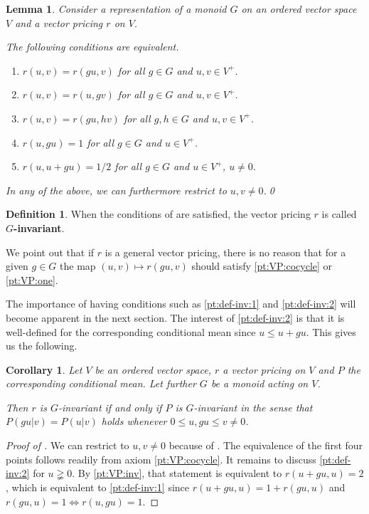 \documentclass[11pt]{amsart}
\numberwithin{equation}{section}
\newtheorem{lem}[thm]{Lemma}
\newtheorem{cor}[thm]{Corollary}
\theoremstyle{definition}
\newtheorem{defi}[thm]{Definition}
\theoremstyle{definition}
\begin{document}
\begin{lem}\label{lem:def-inv}
Consider a representation of a monoid $G$ on an ordered vector space $V$ and a vector pricing $r$ on $V$.

The following conditions are equivalent.
\begin{enumerate}[label=\normalfont(\roman*)]
\item $r(u, v) = r(g u,v)$ for all $g\in G$ and $u,v\in V^+$.
\item $r(u, v) = r(u,g v)$ for all $g\in G$ and $u,v\in V^+$.
\item $r(u, v) = r(g u,h v)$ for all $g, h\in G$ and $u,v\in V^+$.
\item $r(u, g u) = 1$ for all $g\in G$ and $u\in V^+$.\label{pt:def-inv:1}
\item $r(u, u+g u) = 1/2$ for all $g\in G$ and $u\in V^+$, $u\neq 0$.\label{pt:def-inv:2}
\end{enumerate}
In any of the above, we can furthermore restrict to $u,v\neq 0$.\qed
\end{lem}

\begin{defi}\label{defi:def-inv}
When the conditions of  are satisfied, the vector pricing $r$ is called \textbf{$G$-invariant}.
\end{defi}

We point out that if $r$ is a general vector pricing, there is no reason that for a given $g\in G$ the map $(u,v) \mapsto r(g u, v)$ should satisfy \ref{pt:VP:cocycle} or \ref{pt:VP:one}.

The importance of having conditions such as \ref{pt:def-inv:1} and \ref{pt:def-inv:2} will become apparent in the next section. The interest of \ref{pt:def-inv:2} is that it is well-defined for the corresponding conditional mean since $u\leq u+g u$. This gives us the following.

\begin{cor}\label{cor:def-inv}
Let $V$ be an ordered vector space, $r$ a vector pricing on $V$ and $P$ the corresponding conditional mean. Let further $G$ be a monoid acting on $V$.

Then $r$ is $G$-invariant if and only if $P$ is $G$-invariant in the sense that $P(g u | v) = P(u | v)$ holds whenever $0\leq u, g u \leq v\neq 0$.
\end{cor}

\begin{proof}[Proof of ]
We can restrict to $u,v\neq 0$ because of . The equivalence of the first four points follows readily from axiom \ref{pt:VP:cocycle}. It remains to discuss \ref{pt:def-inv:2} for $u\gneqq 0$. By \ref{pt:VP:inv}, that statement is equivalent to $r(u + g u, u)=2$, which is equivalent to \ref{pt:def-inv:1} since $r(u + g u, u)=1+ r(g u, u)$ and $r(g u, u)=1\Leftrightarrow r(u, g u)=1$.
\end{proof}
\end{document}
